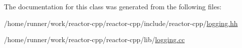 The documentation for this class was generated from the following files\+:\begin{DoxyCompactItemize}
\item 
/home/runner/work/reactor-\/cpp/reactor-\/cpp/include/reactor-\/cpp/\hyperlink{logging_8hh}{logging.\+hh}\item 
/home/runner/work/reactor-\/cpp/reactor-\/cpp/lib/\hyperlink{logging_8cc}{logging.\+cc}\end{DoxyCompactItemize}
